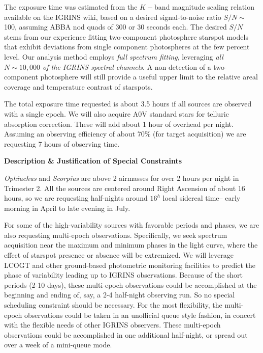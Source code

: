\documentclass[11pt,aas_macros]{article}
\begin{document}
The exposure time was estimated from the $K-$band magnitude scaling relation available on the IGRINS wiki, based on a desired signal-to-noise ratio $S/N \sim$ 100, assuming ABBA nod quads of 300 or 30 seconds each.  The desired $S/N$ stems from our experience fitting two-component photosphere starspot models that exhibit deviations from single component photospheres at the few percent level.  Our analysis method employs \emph{full spectrum fitting}, leveraging \emph{all $N\sim10,000$ of the IGRINS spectral channels}.  A non-detection of a two-component photosphere will still provide a useful upper limit to the relative areal coverage and temperature contrast of starspots.

The total exposure time requested is about 3.5 hours if all sources are observed with a single epoch.  We will also acquire A0V standard stars for telluric absorption correction.  These will add about 1 hour of overhead per night.  Assuming an observing efficiency of about 70\% (for target acquisition) we are requesting 7 hours of observing time.  


\begin{center}{\bf Description \& Justification of Special Constraints}\end{center}

\emph{Ophiuchus} and \emph{Scorpius} are above 2 airmasses for over 2 hours per night in Trimester 2.  All the sources are centered around Right Ascension of about 16 hours, so we are requesting half-nights around $16^h$ local sidereal time-- early morning in April to late evening in July.

For some of the high-variability sources with favorable periods and phases, we are also requesting multi-epoch observations.  Specifically, we seek spectrum acquisition near the maximum and minimum phases in the light curve, where the effect of starspot presence or absence will be extremized.  We will leverage LCOGT and other ground-based photometric monitoring facilities to predict the phase of variability leading up to IGRINS observations.  Because of the short periods (2-10 days), these multi-epoch observations could be accomplished at the beginning and ending of, say, a 2-4 half-night observing run.  So no special scheduling constraint should be necessary.  For the most flexibility, the multi-epoch observations could be taken in an unofficial queue style fashion, in concert with the flexible needs of other IGRINS observers.  These multi-epoch observations could be accomplished in one additional half-night, or spread out over a week of a mini-queue mode.
\end{document}

